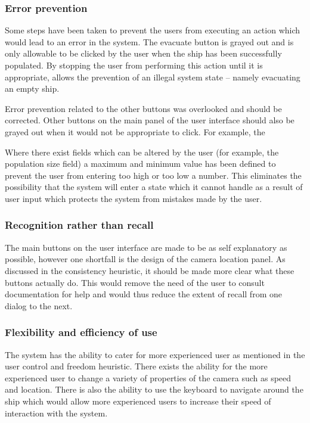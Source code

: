 \documentclass{article}
\begin{document}
\subsubsection{Error prevention}
Some steps have been taken to prevent the users from executing an action which would lead to an error in the system. The evacuate button is grayed out and is only allowable to be clicked by the user when the ship has been successfully populated. By stopping the user from performing this action until it is appropriate, allows the prevention of an illegal system state -- namely evacuating an empty ship.

Error prevention related to the other buttons was overlooked and should be corrected. Other buttons on the main panel of the user interface should also be grayed out when it would not be appropriate to click. For example, the

Where there exist fields which can be altered by the user (for example, the population size field) a maximum and minimum value has been defined to prevent the user from entering too high or too low a number. This eliminates the possibility that the system will enter a state which it cannot handle as a result of user input which protects the system from mistakes made by the user.

\subsubsection{Recognition rather than recall}
The main buttons on the user interface are made to be as self explanatory as possible, however one shortfall is the design of the camera location panel. As discussed in the consistency heuristic, it should be made more clear what these buttons actually do. This would remove the need of the user to consult documentation for help and would thus reduce the extent of recall from one dialog to the next.

\subsubsection{Flexibility and efficiency of use}
The system has the ability to cater for more experienced user as mentioned in the user control and freedom heuristic. There exists the ability for the more experienced user to change a variety of properties of the camera such as speed and location. There is also the ability to use the keyboard to navigate around the ship which would allow more experienced users to increase their speed of interaction with the system.
\end{document}
